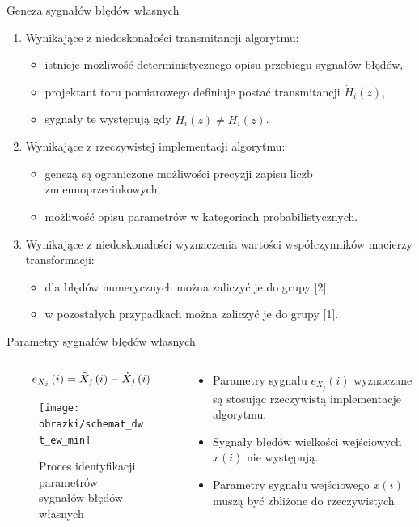 \documentclass[12pt, polish, aspectratio = 169]{slides}
\begin{document}
\begin{frame}{Geneza sygnałów błędów własnych}
\begin{enumerate}
\item Wynikające z niedoskonałości transmitancji algorytmu:
	\begin{itemize}
	\item istnieje możliwość deterministycznego opisu przebiegu sygnałów błędów,
	\item projektant toru pomiarowego definiuje postać transmitancji $\dot{H}_{i}(z)$,
	\item sygnały te występują gdy $\tilde{H}_{i}(z) \ne \dot{H}_{i}(z)$.
	\end{itemize}
\item Wynikające z rzeczywistej implementacji algorytmu:
	\begin{itemize}
	\item genezą są ograniczone możliwości precyzji zapisu liczb zmiennoprzecinkowych,
	\item możliwość opisu parametrów w kategoriach probabilistycznych.
	\end{itemize}
\item Wynikające z niedoskonałości wyznaczenia wartości współczynników macierzy transformacji:
	\begin{itemize}
	\item dla błędów numerycznych można zaliczyć je do grupy [2],
	\item w pozostałych przypadkach można zaliczyć je do grupy [1].
	\end{itemize}
\end{enumerate}
\end{frame}

\begin{frame}{Parametry sygnałów błędów własnych}
\begin{columns}
\begin{column}{0.6\textwidth}
	\begin{equation}
	e_{X_{j}}\left(i\right) = \tilde{X}_{j}\left(i\right) - \dot{X}_{j}\left(i\right) \label{eq:dwt_round_error}
	\end{equation}
	\begin{figure}
	\texttt{[image: obrazki/schemat\_dwt\_ew\_min]}
	\caption{Proces identyfikacji parametrów sygnałów błędów własnych}
	\end{figure}
\end{column}
\begin{column}{0.4\textwidth}
	\begin{itemize}
	\item Parametry sygnału $e_{X_{j}}(i)$ wyznaczane są stosując rzeczywistą implementacje algorytmu.
	\item Sygnały błędów wielkości wejściowych $x(i)$ nie występują.
	\item Parametry sygnału wejściowego $x(i)$ muszą być zbliżone do rzeczywistych.
	\end{itemize}
\end{column}
\end{columns}
\end{frame}
\end{document}
